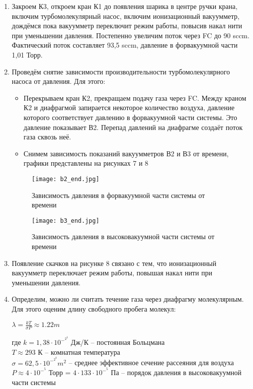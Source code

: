 \documentclass{article}
\begin{document}
\begin{enumerate}
\item Закроем К3, откроем кран К1 до появления шарика в центре ручки крана, включим турбомолекулярный насос, включим ионизационный вакуумметр, дождёмся пока вакуумметр переключит режим работы, повысив накал нити при уменьшении давления. Постепенно увеличим поток через FC до 90 sccm. Фактический поток составляет 93,5 sccm, давление в форвакуумной части 1,01 Торр.
\item Проведём снятие зависимости производительности турбомолекулярного насоса от давления. Для этого:
\begin{itemize}
  \item Перекрываем кран К2, прекращаем подачу газа через FC. Между краном К2 и диафрагмой запирается некоторое количество воздуха, давление которого соответствует давлению в форвакуумной части системы. Это давление показывает В2. Перепад давлений на диафрагме создаёт поток газа сквозь неё.
  \item Снимем зависимость показаний вакуумметров В2 и В3 от времени, графики представлены на рисунках 7 и 8
\end{itemize}  

  \begin{figure}[H]
    \centering
    \texttt{[image: b2\_end.jpg]}
    \caption{Зависимость давления в форвакуумной части системы от времени}
    \label{fig:vac}
\end{figure}

  \begin{figure}[H]
    \centering
    \texttt{[image: b3\_end.jpg]}
    \caption{Зависимость давления в высоковакуумной части системы от времени}
    \label{fig:vac}
\end{figure}

\item Появление скачков на рисунке 8 связано с тем, что ионизационный вакуумметр переключает режим работы, повышая накал нити при уменьшении давления.

\item Определим, можно ли считать течение газа через диафрагму молекулярным. Для этого оценим длину свободного пробега молекул:
\begin{center}
$\lambda = \frac{kT}{\sigma P} \approx 1.22m$
\end{center}
где $k = 1,38 \cdot 10^-^2^3$ Дж/К – постоянная Больцмана\\
      $T \approx 293$ К – комнатная температура\\
       $\sigma = 62,5 \cdot 10^-^2^0 m^2$ – среднее эффективное сечение рассеяния для воздуха\\
       $P \approx 4 \cdot 10^-^5$ Торр = $4 \cdot 133 \cdot 10^-^5$ Па – порядок давления в высоковакуумной части системы\\


\end{enumerate}
\end{document}
